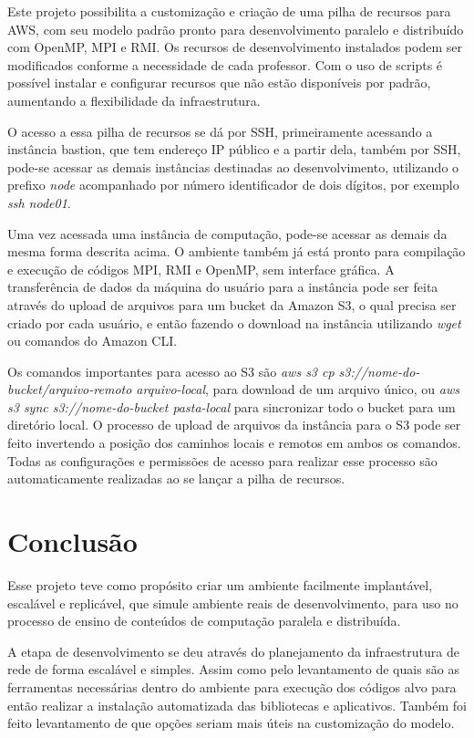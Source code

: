 \documentclass[tg]{mdtufsm}
\begin{document}
Este projeto possibilita a customização e criação de uma pilha de recursos para AWS, com seu modelo padrão pronto para desenvolvimento paralelo e distribuído com OpenMP, MPI e RMI. Os recursos de desenvolvimento instalados podem ser modificados conforme a necessidade de cada professor. Com o uso de scripts é possível instalar e configurar recursos que não estão disponíveis por padrão, aumentando a flexibilidade da infraestrutura.

O acesso a essa pilha de recursos se dá por SSH, primeiramente acessando a instância bastion, que tem endereço IP público e a partir dela, também por SSH, pode-se acessar as demais instâncias destinadas ao desenvolvimento, utilizando o prefixo \emph{node} acompanhado por número identificador de dois dígitos, por exemplo \emph{ssh node01}.

Uma vez acessada uma instância de computação, pode-se acessar as demais da mesma forma descrita acima. O ambiente também já está pronto para compilação e execução de códigos MPI, RMI e OpenMP, sem interface gráfica. A transferência de dados da máquina do usuário para a instância pode ser feita através do upload de arquivos para um bucket da Amazon S3, o qual precisa ser criado por cada usuário, e então fazendo o download na instância utilizando \emph{wget} ou comandos do Amazon CLI.

Os comandos importantes para acesso ao S3 são \emph{aws s3 cp s3://nome-do-bucket/arquivo-remoto arquivo-local}, para download de um arquivo único, ou \emph{aws s3 sync s3://nome-do-bucket pasta-local} para sincronizar todo o bucket para um diretório local. O processo de upload de arquivos da instância para o S3 pode ser feito invertendo a posição dos caminhos locais e remotos em ambos os comandos. Todas as configurações e permissões de acesso para realizar esse processo são automaticamente realizadas ao se lançar a pilha de recursos.

\chapter{Conclusão}

Esse projeto teve como propósito criar um ambiente facilmente implantável, escalável e replicável, que simule ambiente reais de desenvolvimento, para uso no processo de ensino de conteúdos de computação paralela e distribuída.

A etapa de desenvolvimento se deu através do planejamento da infraestrutura de rede de forma escalável e simples. Assim como pelo levantamento de quais são as ferramentas necessárias dentro do ambiente para execução dos códigos alvo para então realizar a instalação automatizada das bibliotecas e aplicativos. Também foi feito levantamento de que opções seriam mais úteis na customização do modelo.
\end{document}
